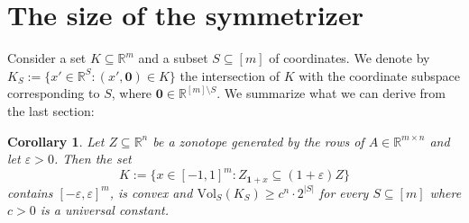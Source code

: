 \documentclass[12pt,english]{article}
\theoremstyle{theorem}
\newtheorem{corollary}[theorem]{Corollary}
\theoremstyle{remark}
\providecommand{\setR}{\mathbb{R}}
\newcommand{\Vol}{\mathrm{Vol}}
\newcommand{\eps}{\varepsilon}
\begin{document}
\fi

\section{The size of the symmetrizer\label{sec:SizeOfSymmetrizer}}


Consider a set $K \subseteq \setR^m$ and a subset $S \subseteq [m]$ of coordinates. We denote by $K_S := \{ x' \in \setR^S : (x',\mathbf{0}) \in K\}$ the intersection of $K$ with the coordinate subspace corresponding to $S$, where $\mathbf{0} \in \setR^{[m] \setminus S}$.
We summarize what we can derive from the last section:
\begin{corollary} \label{thm:VolumetricLowerBoundSections}
  Let $Z \subseteq \setR^n$ be a zonotope generated by the rows of $A \in \setR^{m \times n}$ and let $\eps > 0$. Then the set
  \[ K := \{x \in [-1,1]^m : Z_{\mathbf{1}+x} \subseteq (1+\varepsilon)Z\}\] contains $[-\varepsilon,\varepsilon]^m$, is convex and $\Vol_S (K_S) \ge c^n \cdot 2^{|S|}$ for every $S \subseteq [m]$ where $c>0$ is a universal constant.
\end{corollary}
\end{document}
